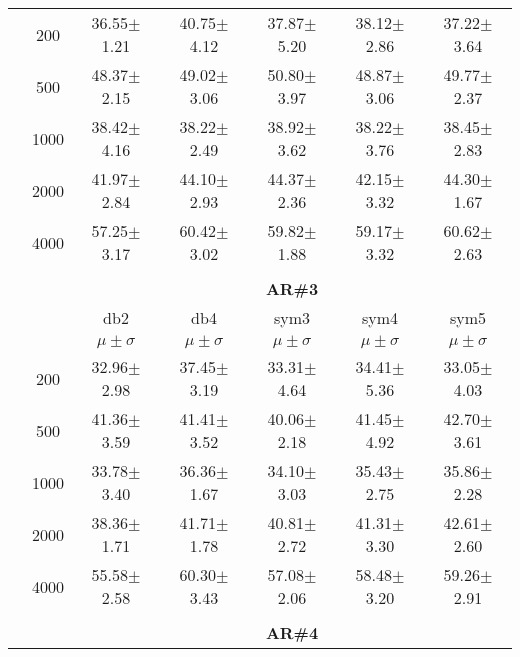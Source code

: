 \begin{table}[H]
\begin{tabular}{|c|c|c c c c c|}
\multicolumn{1}{|c|}{ \multirow{5}{*}{\rotatebox[origin=c]{90}{\textbf{Neurônios}}} }
&200	&36.55$\pm$1.21	&40.75$\pm$4.12	&37.87$\pm$5.20	&38.12$\pm$2.86	&37.22$\pm$3.64\\\cline{2-7}
&500	&48.37$\pm$2.15	&49.02$\pm$3.06	&50.80$\pm$3.97	&48.87$\pm$3.06	&49.77$\pm$2.37\\\cline{2-7}
&1000	&38.42$\pm$4.16	&38.22$\pm$2.49	&38.92$\pm$3.62	&38.22$\pm$3.76	&38.45$\pm$2.83\\\cline{2-7}
&2000	&41.97$\pm$2.84	&44.10$\pm$2.93	&44.37$\pm$2.36	&42.15$\pm$3.32	&44.30$\pm$1.67\\\cline{2-7}
&4000	&57.25$\pm$3.17	&60.42$\pm$3.02	&59.82$\pm$1.88	&59.17$\pm$3.32	&60.62$\pm$2.63


\\ \midrule
\multicolumn{7}{c}{}\\ 



\cline{3-7}
\multicolumn{2}{c|}{\multirow{3}{*}{}} & \multicolumn{5}{c|}{\textbf{AR\#3}}   \\\cline{3-7} 

\multicolumn{2}{c|}{}  & db2 & db4 & sym3 & sym4 & sym5 \\\cline{3-7}
\multicolumn{2}{c|}{}& $\mu \pm \sigma$ & $\mu \pm \sigma$ & $\mu \pm \sigma$ & $\mu \pm \sigma$ & $\mu \pm \sigma$ \\\hline

\multicolumn{1}{|c|}{ \multirow{5}{*}{\rotatebox[origin=c]{90}{\textbf{Neurônios}}} }
&200	&32.96$\pm$2.98	&37.45$\pm$3.19	&33.31$\pm$4.64	&34.41$\pm$5.36	&33.05$\pm$4.03\\\cline{2-7}
&500	&41.36$\pm$3.59	&41.41$\pm$3.52	&40.06$\pm$2.18	&41.45$\pm$4.92	&42.70$\pm$3.61\\\cline{2-7}
&1000	&33.78$\pm$3.40	&36.36$\pm$1.67	&34.10$\pm$3.03	&35.43$\pm$2.75	&35.86$\pm$2.28\\\cline{2-7}
&2000	&38.36$\pm$1.71	&41.71$\pm$1.78	&40.81$\pm$2.72	&41.31$\pm$3.30	&42.61$\pm$2.60\\\cline{2-7}
&4000	&55.58$\pm$2.58	&60.30$\pm$3.43	&57.08$\pm$2.06	&58.48$\pm$3.20	&59.26$\pm$2.91


\\\midrule 
\multicolumn{7}{c}{}\\ 



\cline{3-7}
\multicolumn{2}{c|}{\multirow{3}{*}{}} & \multicolumn{5}{c|}{\textbf{AR\#4}}   \\\cline{3-7} 


\end{tabular}
\end{table}
